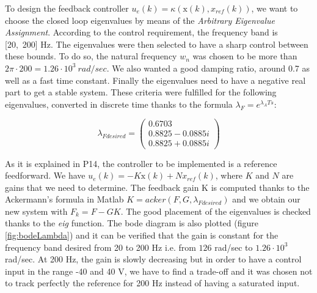 To design the feedback controller $u_e(k) = \kappa (\text{x}(k),x_{ref}(k))$, we want to choose the closed loop eigenvalues by means of the \textit{Arbitrary Eigenvalue Assignment}. 
According to the control requirement, the frequency band is [20,\ 200] Hz. The eigenvalues were then selected to have a sharp control between these bounds. To do so, the natural frequency $w_n$ was chosen to be more than $2\pi \cdot 200 = 1.26 \cdot 10^3 \ rad/sec$. We also wanted a good damping ratio, around 0.7 as well as a fast time constant. Finally the eigenvalues need to have a negative real part to get a stable system. These criteria were fulfilled for the following eigenvalues, converted in discrete time thanks to the formula $\lambda_F = e^{\lambda_A Ts}$:

\begin{equation*}
\lambda_{Fdesired} =  \begin{pmatrix}
0.6703\\
0.8825 - 0.0885i\\
0.8825 + 0.0885i
\end{pmatrix}
\end{equation*}

As it is explained in P14, the controller to be implemented is a reference feedforward. We have $u_e(k) = -K\text{x}(k) + Nx_{ref}(k)$, where $K$ and $N$ are gains that we need to determine.
The feedback gain K is computed thanks to the Ackermann's formula in Matlab $K = acker(F,G,\lambda_{Fdesired})$ and we obtain our new system with $F_k = F-GK$. The good placement of the eigenvalues is checked thanks to the \textit{eig} function. The bode diagram is also plotted (figure \ref{fig:bodeLambda}) and it can be verified that the gain is constant for the frequency band desired from 20 to 200 Hz i.e. from $126$ rad/sec to $1.26 \cdot 10^3$ rad/sec. At 200 Hz, the gain is slowly decreasing but in order to have a control input in the range -40 and 40 V, we have to find a trade-off and it was chosen not to track perfectly the reference for 200 Hz instead of having a saturated input.

